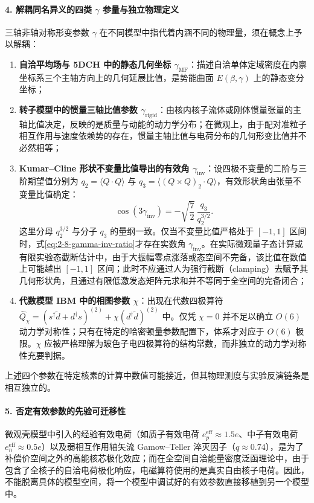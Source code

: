 \paragraph{4. 解耦同名异义的四类 $\gamma$ 参量与独立物理定义}
三轴非轴对称形变参数 $\gamma$ 在不同模型中指代着内涵不同的物理量，须在概念上予以解耦：
\begin{enumerate}
\item \textbf{自洽平均场与 5DCH 中的静态几何坐标 $\gamma_{\mathrm{MF}}$}：描述自洽单体定域密度在内禀坐标系三个主轴方向上的几何延展比值，是势能曲面 $E(\beta, \gamma)$ 上的静态变分坐标；
\item \textbf{转子模型中的惯量三轴比值参数 $\gamma_{\mathrm{rigid}}$}：由核内核子流体或刚体惯量张量的主轴比值决定，反映的是质量与动能的动力学分布；在微观上，由于配对准粒子相互作用与速度依赖势的存在，惯量主轴比值与电荷分布的几何形变比值并不必然相等；
\item \textbf{Kumar--Cline 形状不变量比值导出的有效角 $\gamma_{\mathrm{inv}}$}：设四极不变量的二阶与三阶期望值分别为 $q_2 = \langle Q \cdot Q \rangle$ 与 $q_3 = \langle (Q \times Q)_2 \cdot Q \rangle$，有效形状角由张量不变量比值确定：
\begin{equation}\label{eq:2-8-gamma-inv-ratio}
\cos(3\gamma_{\mathrm{inv}}) = -\sqrt{\frac{7}{2}}\,\frac{q_3}{q_2^{3/2}} .
\end{equation}
这里分母 $q_2^{3/2}$ 与分子 $q_3$ 的量纲一致。仅当不变量比值严格处于 $[-1, 1]$ 区间时，式\eqref{eq:2-8-gamma-inv-ratio}才存在实数角 $\gamma_{\mathrm{inv}}$。在实际微观量子态计算或有限实验态截断估计中，由于大振幅零点涨落或态空间不完备，该比值在数值上可能越出 $[-1, 1]$ 区间；此时不应通过人为强行截断（clamping）去赋予其几何形状角，且通过有限低激发态矩阵元求和并不等同于全空间的完备闭合；
\item \textbf{代数模型 IBM 中的相图参数 $\chi$}：出现在代数四极算符 $\hat{Q}_\chi = (s^\dagger \tilde{d} + d^\dagger s)^{(2)} + \chi (d^\dagger \tilde{d})^{(2)}$ 中。仅凭 $\chi = 0$ 并不足以确立 $O(6)$ 动力学对称性；只有在特定的哈密顿量参数配置下，体系才对应于 $O(6)$ 极限。$\chi$ 应被严格理解为玻色子电四极算符的结构常数，而非独立的动力学对称性充要判据。
\end{enumerate}
上述四个参数在特定核素的计算中数值可能接近，但其物理测度与实验反演链条是相互独立的。

\paragraph{5. 否定有效参数的先验可迁移性}
微观壳模型中引入的经验有效电荷（如质子有效电荷 $e_p^{\mathrm{eff}} \approx 1.5e$、中子有效电荷 $e_n^{\mathrm{eff}} \approx 0.5e$）以及弱相互作用轴矢流 Gamow--Teller 淬灭因子（$q \approx 0.74$），是为了补偿价空间之外的高能核芯极化效应；而在全空间自洽能量密度泛函理论中，由于包含了全核子的自洽电荷极化响应，电磁算符使用的是真实自由核子电荷。因此，不能脱离具体的模型空间，将一个模型中调试好的有效参数直接移植到另一个模型中。


